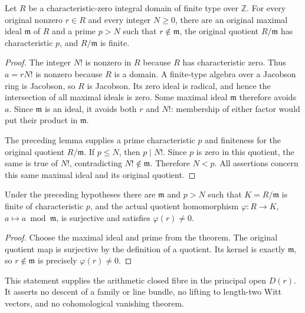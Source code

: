\begin{theorem}
\label{thm:arithmetic-large-characteristic-closed-point}
\leanok
{}
Let $R$ be a characteristic-zero integral domain of finite type over
$\mathbb Z$. For every original nonzero $r\in R$ and every integer
$N\ge0$, there are an original maximal ideal $\mathfrak m$ of $R$ and a
prime $p>N$ such that $r\notin\mathfrak m$, the original quotient
$R/\mathfrak m$ has characteristic $p$, and $R/\mathfrak m$ is finite.
\end{theorem}
\begin{proof}
The integer $N!$ is nonzero in $R$ because $R$ has characteristic zero.
Thus $a=rN!$ is nonzero because $R$ is a domain. A finite-type algebra over
a Jacobson ring is Jacobson, so $R$ is Jacobson. Its zero ideal is radical,
and hence the intersection of all maximal ideals is zero. Some maximal
ideal $\mathfrak m$ therefore avoids $a$. Since $\mathfrak m$ is an ideal,
it avoids both $r$ and $N!$: membership of either factor would put their
product in $\mathfrak m$.

The preceding lemma supplies a prime characteristic $p$ and finiteness for
the original quotient $R/\mathfrak m$. If $p\le N$, then $p\mid N!$.
Since $p$ is zero in this quotient, the same is true of $N!$, contradicting
$N!\notin\mathfrak m$. Therefore $N<p$. All assertions concern this same
maximal ideal and its original quotient.
\end{proof}

\begin{corollary}
\label{cor:arithmetic-large-characteristic-quotient-map}
\leanok
{}
Under the preceding hypotheses there are $\mathfrak m$ and $p>N$ such
that $K=R/\mathfrak m$ is finite of characteristic $p$, and the actual
quotient homomorphism $\varphi:R\to K$, $a\mapsto a\bmod\mathfrak m$,
is surjective and satisfies $\varphi(r)\ne0$.
\end{corollary}
\begin{proof}
Choose the maximal ideal and prime from the theorem. The original quotient
map is surjective by the definition of a quotient. Its kernel is exactly
$\mathfrak m$, so $r\notin\mathfrak m$ is precisely $\varphi(r)\ne0$.
\end{proof}

This statement supplies the arithmetic closed fibre in the principal open
$D(r)$. It asserts no descent of a family or line bundle, no lifting to
length-two Witt vectors, and no cohomological vanishing theorem.
